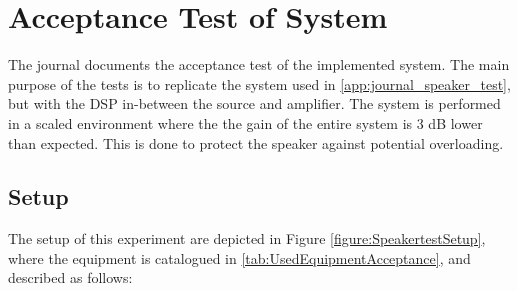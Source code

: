 \chapter{Acceptance Test of System}\label{app:acceptance_test}

The journal documents the acceptance test of the implemented system. The main purpose of the tests is to replicate the system used in \autoref{app:journal_speaker_test}, but with the DSP in-between the source and amplifier. The system is performed in a scaled environment where the the gain of the entire system is 3 dB lower than expected. This is done to protect the speaker against potential overloading.

\section{Setup}

The setup of this experiment are depicted in Figure \ref{figure:SpeakertestSetup}, where the equipment is catalogued in \autoref{tab:UsedEquipmentAcceptance}, and described as follows:

